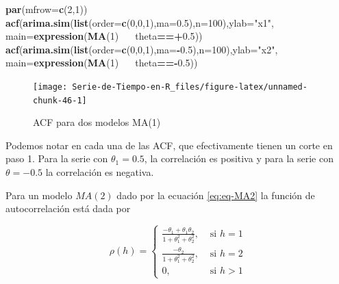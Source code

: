 \documentclass[12pt,]{krantz}
\makeatletter
\newenvironment{Shaded}{\begin{snugshade}}{\end{snugshade}}
\newcommand{\KeywordTok}[1]{\textcolor[rgb]{0.13,0.29,0.53}{\textbf{#1}}}
\newcommand{\DataTypeTok}[1]{\textcolor[rgb]{0.13,0.29,0.53}{#1}}
\newcommand{\DecValTok}[1]{\textcolor[rgb]{0.00,0.00,0.81}{#1}}
\newcommand{\FloatTok}[1]{\textcolor[rgb]{0.00,0.00,0.81}{#1}}
\newcommand{\StringTok}[1]{\textcolor[rgb]{0.31,0.60,0.02}{#1}}
\newcommand{\OperatorTok}[1]{\textcolor[rgb]{0.81,0.36,0.00}{\textbf{#1}}}
\newcommand{\ErrorTok}[1]{\textcolor[rgb]{0.64,0.00,0.00}{\textbf{#1}}}
\newcommand{\NormalTok}[1]{#1}
\newenvironment{kframe}{%
\medskip{}
\setlength{\fboxsep}{.8em}
 \def\at@end@of@kframe{}%
 \ifinner\ifhmode%
  \def\at@end@of@kframe{\end{minipage}}%
  \begin{minipage}{\columnwidth}%
 \fi\fi%
 \def\FrameCommand##1{\hskip\@totalleftmargin \hskip-\fboxsep
 \colorbox{shadecolor}{##1}\hskip-\fboxsep
     \hskip-\linewidth \hskip-\@totalleftmargin \hskip\columnwidth}%
 \MakeFramed {\advance\hsize-\width
   \@totalleftmargin\z@ \linewidth\hsize
   \@setminipage}}%
 {\par\unskip\endMakeFramed%
 \at@end@of@kframe}
\renewenvironment{Shaded}{\begin{kframe}}{\end{kframe}}
\theoremstyle{definition}
\theoremstyle{definition}
\theoremstyle{definition}
\theoremstyle{remark}
\makeatother
\begin{document}
\begin{Shaded}
\begin{Highlighting}[]
\KeywordTok{par}\NormalTok{(}\DataTypeTok{mfrow=}\KeywordTok{c}\NormalTok{(}\DecValTok{2}\NormalTok{,}\DecValTok{1}\NormalTok{))}
\KeywordTok{acf}\NormalTok{(}\KeywordTok{arima.sim}\NormalTok{(}\KeywordTok{list}\NormalTok{(}\DataTypeTok{order=}\KeywordTok{c}\NormalTok{(}\DecValTok{0}\NormalTok{,}\DecValTok{0}\NormalTok{,}\DecValTok{1}\NormalTok{),}\DataTypeTok{ma=}\FloatTok{0.5}\NormalTok{),}\DataTypeTok{n=}\DecValTok{100}\NormalTok{),}\DataTypeTok{ylab=}\StringTok{"x1"}\NormalTok{,}
     \DataTypeTok{main=}\KeywordTok{expression}\NormalTok{(}\KeywordTok{MA}\NormalTok{(}\DecValTok{1}\NormalTok{)}\OperatorTok{~}\ErrorTok{~~}\NormalTok{theta}\OperatorTok{==+}\FloatTok{0.5}\NormalTok{))}
\KeywordTok{acf}\NormalTok{(}\KeywordTok{arima.sim}\NormalTok{(}\KeywordTok{list}\NormalTok{(}\DataTypeTok{order=}\KeywordTok{c}\NormalTok{(}\DecValTok{0}\NormalTok{,}\DecValTok{0}\NormalTok{,}\DecValTok{1}\NormalTok{),}\DataTypeTok{ma=}\OperatorTok{-}\FloatTok{0.5}\NormalTok{),}\DataTypeTok{n=}\DecValTok{100}\NormalTok{),}\DataTypeTok{ylab=}\StringTok{"x2"}\NormalTok{,}
     \DataTypeTok{main=}\KeywordTok{expression}\NormalTok{(}\KeywordTok{MA}\NormalTok{(}\DecValTok{1}\NormalTok{)}\OperatorTok{~}\ErrorTok{~~}\NormalTok{theta}\OperatorTok{==-}\FloatTok{0.5}\NormalTok{))}
\end{Highlighting}
\end{Shaded}

\begin{figure}

{\centering \texttt{[image: Serie-de-Tiempo-en-R\_files/figure-latex/unnamed-chunk-46-1]} 

}

\caption{ACF para dos modelos MA(1)}\label{fig:unnamed-chunk-46}
\end{figure}

Podemos notar en cada una de las ACF, que efectivamente tienen un corte
en paso 1. Para la serie con \(\theta_1=0.5\), la correlación es
positiva y para la serie con \(\theta=-0.5\) la correlación es negativa.

Para un modelo \(MA(2)\) dado por la ecuación \eqref{eq:eq-MA2} la función
de autocorrelación está dada por

\begin{equation}
\rho(h) = \begin{cases}
          \frac{-\theta_1+\theta_1\theta_2}{1+\theta_1^2+\theta_2^2}, &\text{ si }h=1 \\
          \frac{-\theta_2}{1+\theta_1^2+\theta_2^2}, &\text{ si }h=2 \\
          0, &\text{ si }h>1
          \end{cases}
\label{eq:eq-ACF-MA2}
\end{equation}
\end{document}
